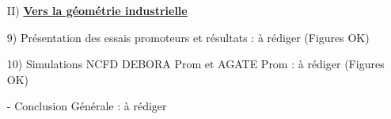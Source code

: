 \documentclass[10pt]{article}
\begin{document}
\begin{itemize}
\item[II)] \textbf{\underline{Vers la géométrie industrielle}}

\item[]

\item[9)] Présentation des essais promoteurs et résultats : à rédiger (Figures OK)

\item[10)] Simulations NCFD DEBORA Prom et AGATE Prom : à rédiger (Figures OK)

\item[]

\item[-] Conclusion Générale : à rédiger
\end{itemize}
\end{document}
